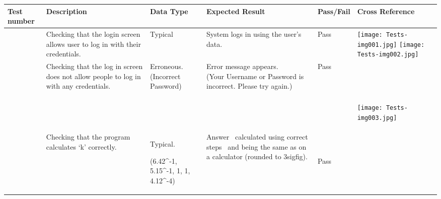 \documentclass[a4paper,landscape,10pt]{article}
\title{}
\begin{document}
\begin{flushleft}
\tablefirsthead{}
\tablehead{}
\tabletail{}
\tablelasttail{}
\begin{supertabular}{|m{1.1899999cm}|m{2.294cm}|m{2.294cm}|m{3cm}|m{1.305cm}|m{15.190001cm}|}
\hline
{\fontsize{11pt}{13.2pt}\selectfont Test number} &
{\fontsize{11pt}{13.2pt}\selectfont Description} &
{\fontsize{11pt}{13.2pt}\selectfont Data Type } &
{\fontsize{11pt}{13.2pt}\selectfont Expected Result} &
{\fontsize{11pt}{13.2pt}\selectfont Pass/Fail} &
{\fontsize{11pt}{13.2pt}\selectfont Cross Reference}\\\hline
{\fontsize{11pt}{13.2pt}} &
{\fontsize{11pt}{13.2pt}\selectfont Checking that the login screen allows user to log in with their credentials.} &
{\fontsize{11pt}{13.2pt}\selectfont Typical} &
{\fontsize{11pt}{13.2pt}\selectfont System logs in using the user's data.} &
{\fontsize{11pt}{13.2pt}\selectfont Pass} &
{\fontsize{11pt}{13.2pt}\selectfont  \texttt{[image: Tests-img001.jpg]}
   \texttt{[image: Tests-img002.jpg]}
 }\\\hline
{\fontsize{11pt}{13.2pt}} &
{\fontsize{11pt}{13.2pt}\selectfont Checking that the log in screen does not allow people to log in with any credentials.} &
{\fontsize{11pt}{13.2pt}\selectfont Erroneous.\newline
(Incorrect Password)} &
{\fontsize{11pt}{13.2pt}\selectfont Error message appears.\newline
(Your Username or Password is incorrect. Please try again.)} &
{\fontsize{11pt}{13.2pt}\selectfont Pass} &
{\fontsize{11pt}{13.2pt}\selectfont ~}

{\fontsize{11pt}{13.2pt}\selectfont ~}

{\fontsize{11pt}{13.2pt}\selectfont   \texttt{[image: Tests-img003.jpg]}
 }\\\hline
{\fontsize{11pt}{13.2pt}} &
{\fontsize{11pt}{13.2pt}\selectfont Checking that the program calculates `k' correctly.} &
{\fontsize{11pt}{13.2pt}\selectfont Typical.}

{\fontsize{11pt}{13.2pt}\selectfont (6.42\^{}-1, 5.15\^{}-1, 1, 1, 4.12\^{}-4)} &
{\fontsize{11pt}{13.2pt}\selectfont Answer ~calculated using correct steps ~and being the same as on a calculator (rounded to 3sigfig).} &
{\fontsize{11pt}{13.2pt}\selectfont ~}

{\fontsize{11pt}{13.2pt}\selectfont Pass} &
{\fontsize{11pt}{13.2pt}\selectfont ~}


\end{supertabular}
\end{flushleft}
\end{document}
